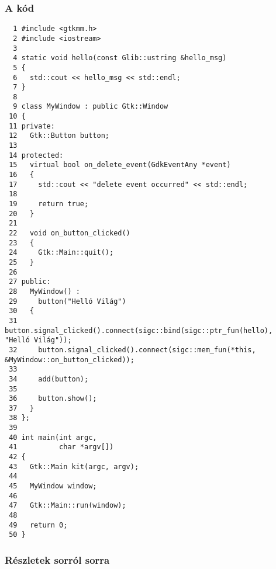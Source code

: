 \subsubsection{A kód}

\vspace{16pt}
\fontsize{6pt}{6pt}
\begin{verbatim}
  1 #include <gtkmm.h>
  2 #include <iostream>
  3 
  4 static void hello(const Glib::ustring &hello_msg)
  5 {
  6   std::cout << hello_msg << std::endl;
  7 }
  8 
  9 class MyWindow : public Gtk::Window
 10 {
 11 private:
 12   Gtk::Button button;
 13 
 14 protected:
 15   virtual bool on_delete_event(GdkEventAny *event)
 16   {
 17     std::cout << "delete event occurred" << std::endl;
 18 
 19     return true;
 20   }
 21 
 22   void on_button_clicked()
 23   {
 24     Gtk::Main::quit();
 25   }
 26 
 27 public:
 28   MyWindow() :
 29     button("Helló Világ")
 30   {
 31     button.signal_clicked().connect(sigc::bind(sigc::ptr_fun(hello), "Helló Világ"));
 32     button.signal_clicked().connect(sigc::mem_fun(*this, &MyWindow::on_button_clicked));
 33 
 34     add(button);
 35 
 36     button.show();
 37   }
 38 };
 39 
 40 int main(int argc,
 41          char *argv[])
 42 {
 43   Gtk::Main kit(argc, argv);
 44 
 45   MyWindow window;
 46 
 47   Gtk::Main::run(window);
 48 
 49   return 0;
 50 }
\end{verbatim}

\subsubsection{Részletek sorról sorra}

